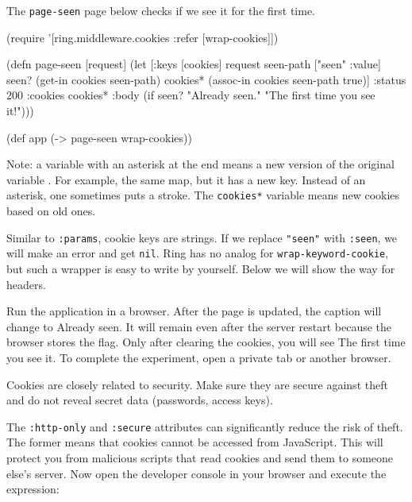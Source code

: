 The \verb|page-seen| page below checks if we see it for the first time.


\begin{english}
\begin{clojure/lines}
(require '[ring.middleware.cookies
:refer [wrap-cookies]])

(defn page-seen [request]
(let [{:keys [cookies]} request
seen-path ["seen" :value]
seen? (get-in cookies seen-path)
cookies* (assoc-in cookies seen-path true)]
{:status 200
:cookies cookies*
:body (if seen?
"Already seen."
"The first time you see it!")}))

(def app (-> page-seen
wrap-cookies))
\end{clojure/lines}
\end{english}

Note: a variable with an asterisk at the end means a new version of the original variable . For example, the same map, but it has a new key. Instead of an asterisk, one sometimes puts a stroke. The \verb|cookies*| variable means new cookies based on old ones.


Similar to \verb|:params|, cookie keys are strings. If we replace \verb|"seen"| with \verb|:seen|, we will make an error and get \verb|nil|. Ring has no analog for \verb|wrap-keyword-cookie|, but such a wrapper is easy to write by yourself. Below we will show the way for headers.

Run the application in a browser. After the page is updated, the caption will change to Already seen. It will remain even after the server restart because the browser stores the flag. Only after clearing the cookies, you will see The first time you see it. To complete the experiment, open a private tab or another browser.


Cookies are closely related to security. Make sure they are secure against theft and do not reveal secret data (passwords, access keys).

The \verb|:http-only| and \verb|:secure| attributes can significantly reduce the risk of theft. The former means that cookies cannot be accessed from JavaScript. This will protect you from malicious scripts that read cookies and send them to someone else's server.  Now open the developer console in your browser and execute the expression:

